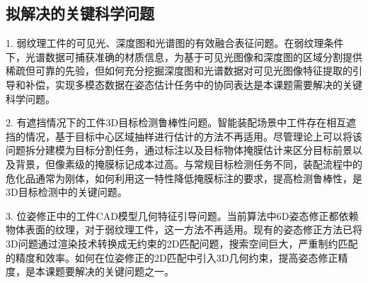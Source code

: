 \documentclass[12pt]{article}
\begin{document}



\subsection{拟解决的关键科学问题}

1. 弱纹理工件的可见光、深度图和光谱图的有效融合表征问题。在弱纹理条件下，光谱数据可捕获准确的材质信息，为基于可见光图像和深度图的区域分割提供稀疏但可靠的先验，但如何充分挖掘深度图和光谱数据对可见光图像特征提取的引导和补偿，实现多模态数据在姿态估计任务中的协同表达是本课题需要解决的关键科学问题。

2. 有遮挡情况下的工件3D目标检测鲁棒性问题。智能装配场景中工件存在相互遮挡的情况，基于目标中心区域抽样进行估计的方法不再适用。尽管理论上可以将该问题拆分建模为目标分割任务，通过标注以及目标物体掩膜估计来区分目标前景以及背景，但像素级的掩膜标记成本过高。与常规目标检测任务不同，装配流程中的危化品通常为刚体，如何利用这一特性降低掩膜标注的要求，提高检测鲁棒性，是3D目标检测中的关键问题。

3. 位姿修正中的工件CAD模型几何特征引导问题。当前算法中6D姿态修正都依赖物体表面的纹理，对于弱纹理工件，这一方法不再适用。现有的姿态修正方法已将3D问题通过渲染技术转换成无约束的2D匹配问题，搜索空间巨大，严重制约匹配的精度和效率。如何在位姿修正的2D匹配中引入3D几何约束，提高姿态修正精度，是本课题要解决的关键问题之一。
\end{document}
